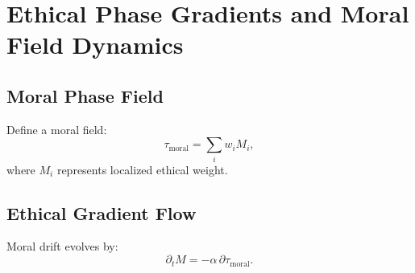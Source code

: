 \chapter{Ethical Phase Gradients and Moral Field Dynamics}

\section{Moral Phase Field}
Define a moral field:
\[
\tau_{\mathrm{moral}} = \sum_i w_i M_i,
\]
where \(M_i\) represents localized ethical weight.

\section{Ethical Gradient Flow}
Moral drift evolves by:
\[
\partial_t M = -\alpha\,\partial\tau_{\mathrm{moral}}.
\]

